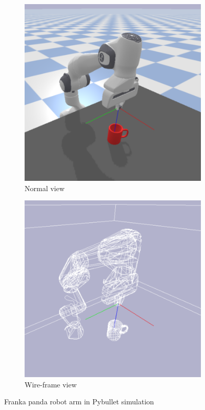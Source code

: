\begin{figure}[h]
    \centering
    \begin{subfigure}[b]{0.45\textwidth}
        \includegraphics[width=\textwidth]{figures/robot-arm.png}
        \caption{Normal view}
        \label{fig:arm-normal}
    \end{subfigure}
    \hfill
    \begin{subfigure}[b]{0.45\textwidth}
        \includegraphics[width=\textwidth]{figures/robot-arm-wireframe.png}
        \caption{Wire-frame view}
        \label{fig:arm-wire}
    \end{subfigure}
    \caption{Franka panda robot arm in Pybullet simulation}
    \label{fig:robot-arm}
\end{figure}

